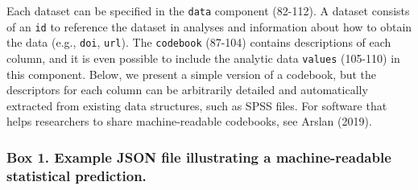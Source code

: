 \documentclass[english,doc,floatsintext]{apa6}
\begin{document}
Each dataset can be specified in the \texttt{data} component (82-112). A dataset consists of an \texttt{id} to reference the dataset in analyses and information about how to obtain the data (e.g., \texttt{doi}, \texttt{url}). The \texttt{codebook} (87-104) contains descriptions of each column, and it is even possible to include the analytic data \texttt{values} (105-110) in this component. Below, we present a simple version of a codebook, but the descriptors for each column can be arbitrarily detailed and automatically extracted from existing data structures, such as SPSS files. For software that helps researchers to share machine-readable codebooks, see Arslan (2019).
\newpage

\hypertarget{box-1.-example-json-file-illustrating-a-machine-readable-statistical-prediction.}{%
\subsubsection{Box 1. Example JSON file illustrating a machine-readable statistical prediction.}\label{box-1.-example-json-file-illustrating-a-machine-readable-statistical-prediction.}}
\end{document}
